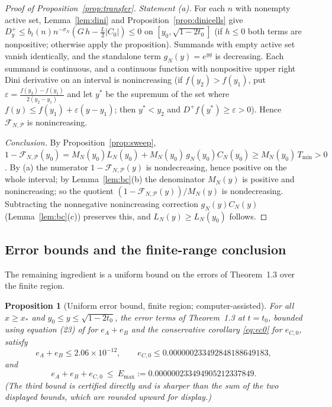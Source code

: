 \documentclass[11pt]{article}
\newtheorem{proposition}[theorem]{Proposition}
\theoremstyle{definition}
\newcommand{\eps}{\varepsilon}
\newcommand{\calP}{\mathcal{P}}
\begin{document}
\begin{proof}[Proof of Proposition~\ref{prop:transfer}]
\emph{Statement (a).} For each $n$ with nonempty active set,
Lemma~\ref{lem:dini} and Proposition~\ref{prop:dinicells} give
$D^+_y\le b_t(n)n^{-\sigma_N}(G\,h-\frac L2|C_0|)\le0$ on
$[y_0,\sqrt{1-2t_0}]$ (if $h\le0$ both terms are nonpositive;
otherwise apply the proposition). Summands with empty active set
vanish identically, and the standalone term $g_N(y)=e^{yg}$ is
decreasing. Each summand is continuous, and a continuous function
with nonpositive upper right Dini derivative on an interval is
nonincreasing (if $f(y_2)>f(y_1)$, put
$\eps=\frac{f(y_2)-f(y_1)}{2(y_2-y_1)}$ and let $y^*$ be the
supremum of the set where $f(y)\le f(y_1)+\eps(y-y_1)$; then
$y^*<y_2$ and $D^+f(y^*)\ge\eps>0$). Hence
$\mathcal F_{N,\calP}$ is nonincreasing.

\emph{Conclusion.} By Proposition~\ref{prop:sweep},
$1-\mathcal F_{N,\calP}(y_0)=M_N(y_0)L_N(y_0)+M_N(y_0)\,
g_N(y_0)C_N(y_0)\ge M_N(y_0)\,T_{\min}>0$. By (a) the numerator
$1-\mathcal F_{N,\calP}(y)$ is nondecreasing, hence positive on the
whole interval; by Lemma~\ref{lem:bc}(b) the denominator $M_N(y)$
is positive and nonincreasing; so the quotient
$(1-\mathcal F_{N,\calP}(y))/M_N(y)$ is nondecreasing. Subtracting
the nonnegative nonincreasing correction $g_N(y)C_N(y)$
(Lemma~\ref{lem:bc}(c)) preserves this, and
$L_N(y)\ge L_N(y_0)$ follows.
\end{proof}

\subsection{Error bounds and the finite-range conclusion}
\label{sec:finiteerr}

The remaining ingredient is a uniform bound on the errors of
Theorem~1.3 over the finite region.

\begin{proposition}[Uniform error bound, finite region;
computer-assisted]\label{prop:finiteerr}
For all $x\ge x_*$ and $y_0\le y\le\sqrt{1-2t_0}$, the error terms
of Theorem~1.3 at $t=t_0$, bounded using equation (23) of
\cite{Polymath} for $e_A+e_B$ and the conservative corollary
\eqref{eq:ec0} for $e_{C,0}$, satisfy
\[
e_A+e_B\le2.06\times10^{-12},\qquad
e_{C,0}\le0.000000233492848188649183,
\]
and
\[
e_A+e_B+e_{C,0}\ \le\ E_{\max}:=0.000000233494905212337849 .
\]
(The third bound is certified directly and is sharper than the sum
of the two displayed bounds, which are rounded upward for display.)
\end{proposition}
\end{document}
